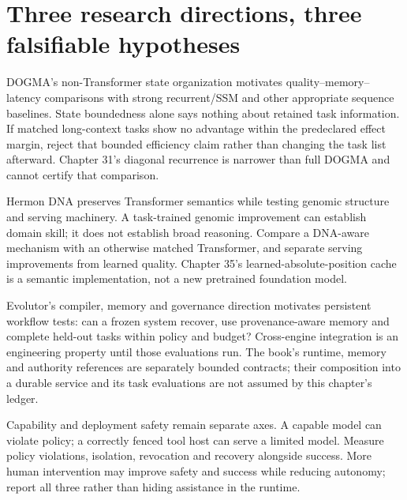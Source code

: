 \section{Three research directions, three falsifiable hypotheses}
DOGMA's non-Transformer state organization motivates quality--memory--latency
comparisons with strong recurrent/SSM and other appropriate sequence baselines.
State boundedness alone says nothing about retained task information. If matched
long-context tasks show no advantage within the predeclared effect margin,
reject that bounded efficiency claim rather than changing the task list afterward.
Chapter 31's diagonal recurrence is narrower than full DOGMA and cannot certify
that comparison.

Hermon DNA preserves Transformer semantics while testing genomic structure and
serving machinery. A task-trained genomic improvement can establish domain skill;
it does not establish broad reasoning. Compare a DNA-aware mechanism with an
otherwise matched Transformer, and separate serving improvements from learned
quality. Chapter 35's learned-absolute-position cache is a semantic implementation,
not a new pretrained foundation model.

Evolutor's compiler, memory and governance direction motivates persistent
workflow tests: can a frozen system recover, use provenance-aware memory and
complete held-out tasks within policy and budget? Cross-engine integration is
an engineering property until those evaluations run. The book's runtime,
memory and authority references are separately bounded contracts; their
composition into a durable service and its task evaluations are not assumed
by this chapter's ledger.

Capability and deployment safety remain separate axes. A capable model can
violate policy; a correctly fenced tool host can serve a limited model. Measure
policy violations, isolation, revocation and recovery alongside success. More
human intervention may improve safety and success while reducing autonomy;
report all three rather than hiding assistance in the runtime.

